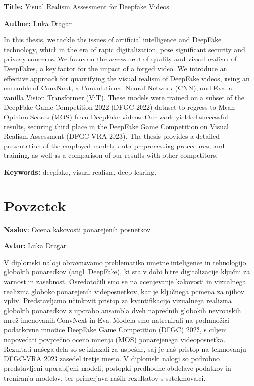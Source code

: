 \documentclass[a4paper,12pt,openright]{book}
\newcommand{\ttitle}{Ocena kakovosti ponarejenih posnetkov}
\newcommand{\ttitleEn}{Visual Realism Assessment for Deepfake Videos}
\newcommand{\tauthor}{Luka Dragar}
\newcommand{\tkeywordsEn}{deepfake, visual realism, deep learing}
\newcommand{\clearemptydoublepage}{\newpage{\pagestyle{empty}\cleardoublepage}}
\begin{document}
\noindent\textbf{Title:} \ttitleEn
\bigskip

\noindent\textbf{Author:} \tauthor
\bigskip

\noindent In this thesis, we tackle the issues of artificial intelligence and DeepFake technology, which in the era of rapid digitalization, pose significant security and privacy concerns. We focus on the assessment of quality and visual realism of DeepFakes, a key factor for the impact of a forged video. We introduce an effective approach for quantifying the visual realism of DeepFake videos, using an ensemble of ConvNext, a Convolutional Neural Network (CNN), and Eva, a vanilla Vision Transformer (ViT). These models were trained on a subset of the DeepFake Game Competition 2022 (DFGC 2022) dataset to regress to Mean Opinion Scores (MOS) from DeepFake videos. Our work yielded successful results, securing third place in the DeepFake Game Competition on Visual Realism Assessment (DFGC-VRA 2023). The thesis provides a detailed presentation of the employed models, data preprocessing procedures, and training, as well as a comparison of our results with other competitors.



\bigskip

\noindent\textbf{Keywords:} \tkeywordsEn.
\clearemptydoublepage

{}
\chapter*{Povzetek}

\noindent\textbf{Naslov:} \ttitle
\bigskip

\noindent\textbf{Avtor:} \tauthor
\bigskip

\noindent V diplomski nalogi obravnavamo problematiko umetne inteligence in tehno\-logijo globokih ponaredkov (angl. DeepFake), ki sta v dobi hitre digitalizacije ključni za varnost in zasebnost. Osredotočili smo se na ocenjevanje kakovosti in vizualnega realizma globoko ponarejenih videposnetkov, kar je ključnega pomena za njihov vpliv. Predstavljamo učinkovit pristop za kvantifikacijo vizualnega realizma globokih ponaredkov z uporabo ansambla dveh naprednih globokih nevronskih mrež imenovanih ConvNext in Eva. Modela smo natrenirali na podmnožici podatkovne množice DeepFake Game Competition (DFGC) 2022, s ciljem napovedati povprečno oceno mnenja (MOS) ponarejenega videoposnetka. Rezultati našega dela so se izkazali za uspešne, saj je naš pristop na tekmovanju DFGC-VRA 2023 zasedel tretje mesto. V diplomski nalogi so podrobno predstavljeni uporabljeni modeli, postopki predhodne obdelave podatkov in treniranja modelov, ter primerjava naših rezultatov s sotekmovalci.
\end{document}

